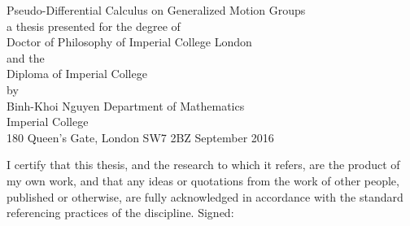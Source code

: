 \begin{titlepage}
\begin{center}
\null\vfill
{\LARGE{Pseudo-Differential Calculus on Generalized Motion Groups}}
\\
\vfill
{\footnotesize
{a thesis presented for the degree of}\\
Doctor of Philosophy of Imperial College London\\
{and the}\\
Diploma of Imperial College\\
{by} \\
}
{\large{Binh-Khoi Nguyen}}
\vfill\vfill\vfill
{\footnotesize{
Department of Mathematics\\
Imperial College \\
180 Queen's Gate, London SW7 2BZ}
\vfill
{{September 2016}}
}
\end{center}
\end{titlepage}

\newpage
\hphantom{1}
\vfill
\noindent I certify that this thesis, and the research to which it refers,
are the product of my own work, and that any ideas or quotations from the
work of other people, published or otherwise, are fully acknowledged in accordance
with the standard referencing practices of the discipline.
\vfill
{\hfill Signed: \hrulefill}
\vfill
